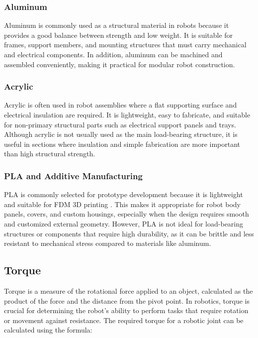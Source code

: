 \subsubsection{Aluminum}
Aluminum is commonly used as a structural material in robots because it provides a good balance between strength and low weight. It is suitable for frames, support members, and mounting structures that must carry mechanical and electrical components. In addition, aluminum can be machined and assembled conveniently, making it practical for modular robot construction.

\subsubsection{Acrylic}
Acrylic is often used in robot assemblies where a flat supporting surface and electrical insulation are required. It is lightweight, easy to fabricate, and suitable for non-primary structural parts such as electrical support panels and trays. Although acrylic is not usually used as the main load-bearing structure, it is useful in sections where insulation and simple fabrication are more important than high structural strength.

\subsubsection{PLA and Additive Manufacturing}
PLA is commonly selected for prototype development because it is lightweight and suitable for FDM 3D printing \cite{sapkota2024fdm}. This makes it appropriate for robot body panels, covers, and custom housings, especially when the design requires smooth and customized external geometry. However, PLA is not ideal for load-bearing structures or components that require high durability, as it can be brittle and less resistant to mechanical stress compared to materials like aluminum.

\subsection{Torque}
Torque is a measure of the rotational force applied to an object, calculated as the product of the force and the distance from the pivot point. In robotics, torque is crucial for determining the robot's ability to perform tasks that require rotation or movement against resistance. The required torque for a robotic joint can be calculated using the formula:

